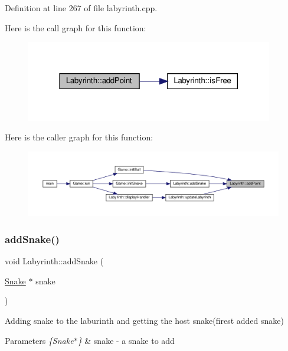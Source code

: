 Definition at line 267 of file labyrinth.\+cpp.

Here is the call graph for this function\+:
\nopagebreak
\begin{figure}[H]
\begin{center}
\leavevmode
\includegraphics[width=306pt]{class_labyrinth_a710cf4ff7789d527e6081d1eb2d696a6_cgraph}
\end{center}
\end{figure}
Here is the caller graph for this function\+:
\nopagebreak
\begin{figure}[H]
\begin{center}
\leavevmode
\includegraphics[width=350pt]{class_labyrinth_a710cf4ff7789d527e6081d1eb2d696a6_icgraph}
\end{center}
\end{figure}
\mbox{\label{class_labyrinth_ad2819aba76d079c7fda751e7388b7182}} 
\subsubsection{\texorpdfstring{addSnake()}{addSnake()}}
{\footnotesize\ttfamily void Labyrinth\+::add\+Snake (\begin{DoxyParamCaption}\item[{\mbox{\hyperlink{class_snake}{Snake}} $\ast$}]{snake }\end{DoxyParamCaption})}

Adding snake to the laburinth and getting the host snake(firest added snake) 
\begin{DoxyParams}{Parameters}
{\em \{\+Snake$\ast$\}} & snake -\/ a snake to add \\
\hline
\end{DoxyParams}


